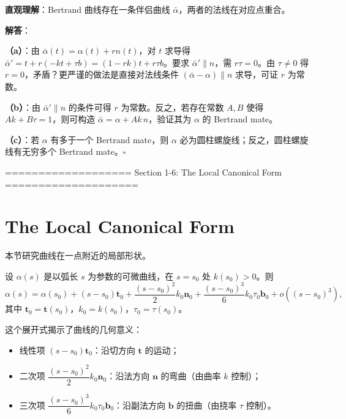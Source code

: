 \begin{solution}
\textbf{直观理解}：Bertrand 曲线存在一条伴侣曲线 $\bar{\alpha}$，两者的法线在对应点重合。

\textbf{解答}：

\textbf{（a）}：由 $\bar{\alpha}(t) = \alpha(t) + r n(t)$，对 $t$ 求导得 $\bar{\alpha}' = t + r(-kt + \tau b) = (1-rk)t + r\tau b$。要求 $\bar{\alpha}' \parallel n$，需 $r\tau = 0$。由 $\tau\neq 0$ 得 $r = 0$，矛盾？更严谨的做法是直接对法线条件 $(\bar{\alpha}-\alpha)\parallel n$ 求导，可证 $r$ 为常数。

\textbf{（b）}：由 $\bar{\alpha}' \parallel n$ 的条件可得 $r$ 为常数。反之，若存在常数 $A, B$ 使得 $Ak + B\tau = 1$，则可构造 $\bar{\alpha} = \alpha + Ak\, n$，验证其为 $\alpha$ 的 Bertrand mate。

\textbf{（c）}：若 $\alpha$ 有多于一个 Bertrand mate，则 $\alpha$ 必为圆柱螺旋线；反之，圆柱螺旋线有无穷多个 Bertrand mate。$\square$
\end{solution}

=================== Section 1-6: The Local Canonical Form ====================
\section{The Local Canonical Form}\label{sec:local-canonical-form-ch1}

本节研究曲线在一点附近的局部形状。

\begin{Theorem}[曲线在一点的局部标准形式]\label{th:local-canonical-form-ch1}
设 $\alpha(s)$ 是以弧长 $s$ 为参数的可微曲线，在 $s = s_0$ 处 $k(s_0) > 0$。则
\[
\alpha(s) = \alpha(s_0) + (s - s_0)\mathbf{t}_0 + \frac{(s - s_0)^2}{2}k_0\mathbf{n}_0 + \frac{(s - s_0)^3}{6}k_0\tau_0\mathbf{b}_0 + o((s - s_0)^3),
\]
其中 $\mathbf{t}_0 = \mathbf{t}(s_0)$，$k_0 = k(s_0)$，$\tau_0 = \tau(s_0)$。
\end{Theorem}

\begin{Remark}
这个展开式揭示了曲线的几何意义：
\begin{itemize}
\item 线性项 $(s - s_0)\mathbf{t}_0$：沿切方向 $\mathbf{t}$ 的运动；
\item 二次项 $\dfrac{(s - s_0)^2}{2}k_0\mathbf{n}_0$：沿法方向 $\mathbf{n}$ 的弯曲（由曲率 $k$ 控制）；
\item 三次项 $\dfrac{(s - s_0)^3}{6}k_0\tau_0\mathbf{b}_0$：沿副法方向 $\mathbf{b}$ 的扭曲（由挠率 $\tau$ 控制）。
\end{itemize}
\end{Remark}

